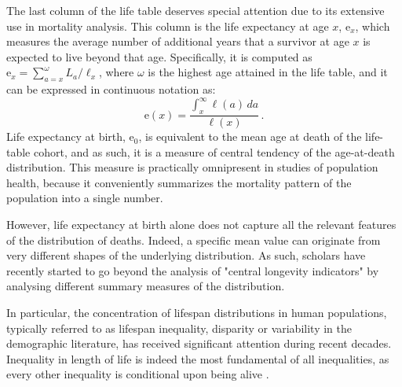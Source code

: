 \documentclass[Thesis]{subfiles}
\begin{document}
The last column of the life table deserves special attention due to its extensive use in mortality analysis. This column is the life expectancy at age $x$, $\mathrm{e}_x$, which measures the average number of additional years that a survivor at age $x$ is expected to live beyond that age. Specifically, it is computed as $\mathrm{e}_x=\sum_{a=x}^{\omega}L_a / \ell_x$, where $\omega$ is the highest age attained in the life table, and it can be expressed in continuous notation as:
%  
\begin{equation}\label{Eq:Ch1LifeExp}
\mathrm{e}(x) = \frac{\int_{x}^{\infty} \ell(a)\,da}{\ell(x)} \, .
\end{equation}
%
Life expectancy at birth, $\mathrm{e}_0$, is equivalent to the mean age at death of the life-table cohort, and as such, it is a measure of central tendency of the age-at-death distribution. This measure is practically omnipresent in studies of population health, because it conveniently summarizes the mortality pattern of the population into a single number.  

However, life expectancy at birth alone does not capture all the relevant features of the distribution of deaths. Indeed, a specific mean value can originate from very different shapes of the underlying distribution. As such, scholars have recently started to go beyond the analysis of "central longevity indicators" \cite[mean, median and modal age at death,][]{cheung2005three} by analysing different summary measures of the distribution. 

In particular, the concentration of lifespan distributions in human populations, typically referred to as lifespan inequality, disparity or variability in the demographic literature, has received significant attention during recent decades.  Inequality in length of life is indeed the most fundamental of all inequalities, as every other inequality is conditional upon being alive \citep{vanraalte2018case}.
\end{document}
